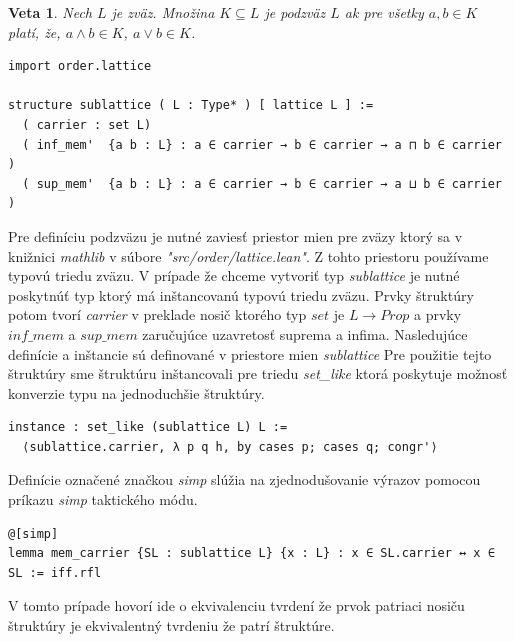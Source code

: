 \documentclass[a4paper,10pt,oneside]{report}%
\newtheorem{theorem}{Veta}[chapter]
\begin{document}
\begin{theorem}
    Nech $L$ je zväz. Množina $K \subseteq L$ je \emph{podzväz} $L$ ak pre všetky 
$a,b \in K$ platí, že, $a \wedge b \in K$, $a \vee b \in K$.
\end{theorem}
\begin{lstlisting}
import order.lattice

structure sublattice ( L : Type* ) [ lattice L ] :=
  ( carrier : set L)
  ( inf_mem'  {a b : L} : a ∈ carrier → b ∈ carrier → a ⊓ b ∈ carrier )
  ( sup_mem'  {a b : L} : a ∈ carrier → b ∈ carrier → a ⊔ b ∈ carrier )
\end{lstlisting}
    Pre definíciu podzväzu je nutné zaviesť priestor mien pre zväzy ktorý sa v knižnici
\emph{mathlib} v súbore \emph{"src/order/lattice.lean"}.
    Z tohto priestoru používame typovú triedu zväzu.
    V prípade že chceme vytvoriť typ \emph{sublattice} je nutné poskytnúť
typ ktorý má inštancovanú typovú triedu zväzu.
    Prvky štruktúry potom tvorí \emph{carrier} v preklade nosič ktorého typ
$set$ je $L \to Prop$ a prvky $inf\_mem$ a $sup\_mem$ zaručujúce uzavretosť
    suprema a infima.
    Nasledujúce definície a inštancie sú definované v priestore mien \emph{sublattice}
    Pre použitie tejto štruktúry sme štruktúru inštancovali pre triedu \emph{set\_like}
ktorá poskytuje možnosť konverzie typu na jednoduchšie štruktúry.
\begin{lstlisting}
instance : set_like (sublattice L) L :=
  ⟨sublattice.carrier, λ p q h, by cases p; cases q; congr'⟩
\end{lstlisting}
    Definície označené značkou \emph{simp} slúžia na zjednodušovanie výrazov
pomocou príkazu \emph{simp} taktického módu.
\begin{lstlisting}
@[simp]
lemma mem_carrier {SL : sublattice L} {x : L} : x ∈ SL.carrier ↔ x ∈ SL := iff.rfl
\end{lstlisting}
    V tomto prípade hovorí ide o ekvivalenciu tvrdení že prvok patriaci nosiču
štruktúry je ekvivalentný tvrdeniu že patrí štruktúre.
\end{document}
